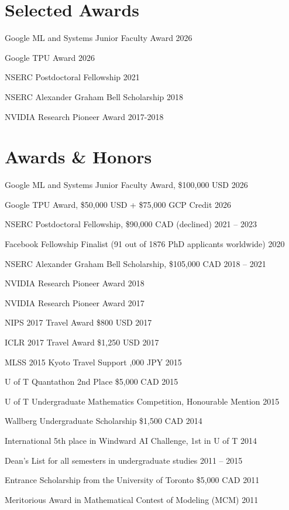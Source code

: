\if{}
\section{\sc Selected Awards}
\begin{list2}
\item Google ML and Systems Junior Faculty Award \hfill 2026
\item Google TPU Award \hfill 2026
\item NSERC Postdoctoral Fellowship \hfill 2021
\item NSERC Alexander Graham Bell Scholarship \hfill 2018
\item NVIDIA Research Pioneer Award \hfill 2017-2018
\end{list2}
\else
\section{\sc Awards \& Honors}
\begin{list2}
\item Google ML and Systems Junior Faculty Award, \$100,000 USD \hfill 2026
\item Google TPU Award, \$50,000 USD + \$75,000 GCP Credit \hfill 2026
\item NSERC Postdoctoral Fellowship, \$90,000 CAD (declined) \hfill 2021 -- 2023
\item Facebook Fellowship Finalist (91 out of 1876 PhD applicants worldwide) \hfill 2020
\item NSERC Alexander Graham Bell Scholarship, \$105,000 CAD \hfill 2018 -- 2021
\item NVIDIA Research Pioneer Award  \hfill 2018
\item NVIDIA Research Pioneer Award  \hfill 2017
\item NIPS 2017 Travel Award \$800 USD \hfill 2017
\item ICLR 2017 Travel Award \$1,250 USD \hfill 2017
\item MLSS 2015 Kyoto Travel Support ,000 JPY \hfill 2015
\item U of T Quantathon 2nd Place \$5,000 CAD \hfill 2015
\item U of T Undergraduate Mathematics Competition, Honourable Mention \hfill 2015
\item Wallberg Undergraduate Scholarship \$1,500 CAD \hfill 2014
\item International 5th place in Windward AI Challenge, 1st in U of T \hfill 2014
\item Dean's List for all semesters in undergraduate studies \hfill 2011 -- 2015
\item Entrance Scholarship from the University of Toronto \$5,000 CAD \hfill 2011
\item Meritorious Award in Mathematical Contest of Modeling (MCM) \hfill 2011
\end{list2}
\fi
